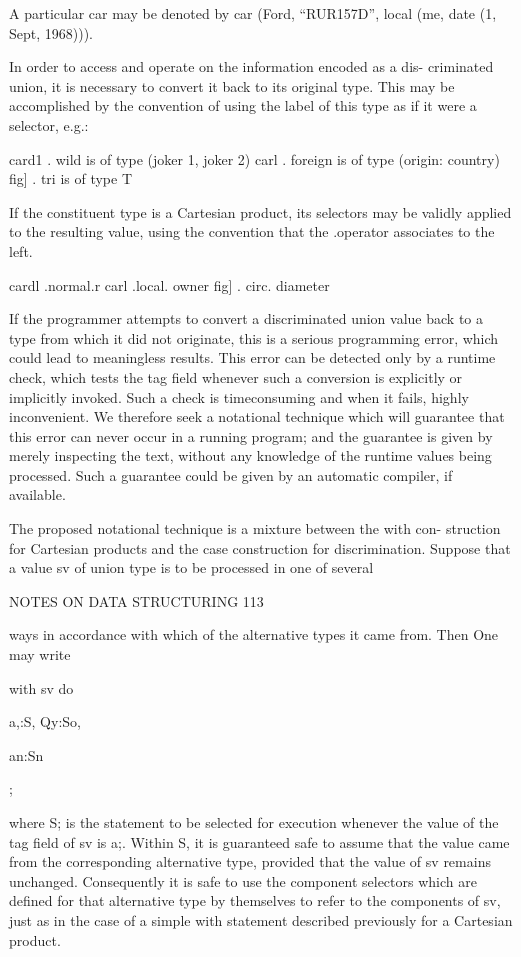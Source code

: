 {	A particular car may be denoted by car (Ford, “RUR157D”, local (me, date (1, Sept, 1968))).
	
	In order to access and operate on the information encoded as a dis- criminated union, it is necessary to convert it back to its original type. This may be accomplished by the convention of using the label of this type as if it were a selector, e.g.:
	
	card1 . wild is of type (joker 1, joker 2) carl . foreign is of type (origin: country) fig] . tri is of type T
	
	If the constituent type is a Cartesian product, its selectors may be validly applied to the resulting value, using the convention that the .operator associates to the left.
	
	cardl .normal.r carl .local. owner fig] . circ. diameter
	
	If the programmer attempts to convert a discriminated union value back to a type from which it did not originate, this is a serious programming error, which could lead to meaningless results. This error can be detected only by a runtime check, which tests the tag field whenever such a conversion is explicitly or implicitly invoked. Such a check is timeconsuming and when it fails, highly inconvenient. We therefore seek a notational technique which will guarantee that this error can never occur in a running program; and the guarantee is given by merely inspecting the text, without any knowledge of the runtime values being processed. Such a guarantee could be given by an automatic compiler, if available.
	
	The proposed notational technique is a mixture between the with con- struction for Cartesian products and the case construction for discrimination. Suppose that a value sv of union type is to be processed in one of several
	
	NOTES ON DATA STRUCTURING 113
	
	ways in accordance with which of the alternative types it came from. Then One may write
	
	with sv do {a,:S, Qy:So,
		
		an:Sn};
	
	where S; is the statement to be selected for execution whenever the value of the tag field of sv is a;. Within S, it is guaranteed safe to assume that the value came from the corresponding alternative type, provided that the value of sv remains unchanged. Consequently it is safe to use the component selectors which are defined for that alternative type by themselves to refer to the components of sv, just as in the case of a simple with statement described previously for a Cartesian product.
	
}
